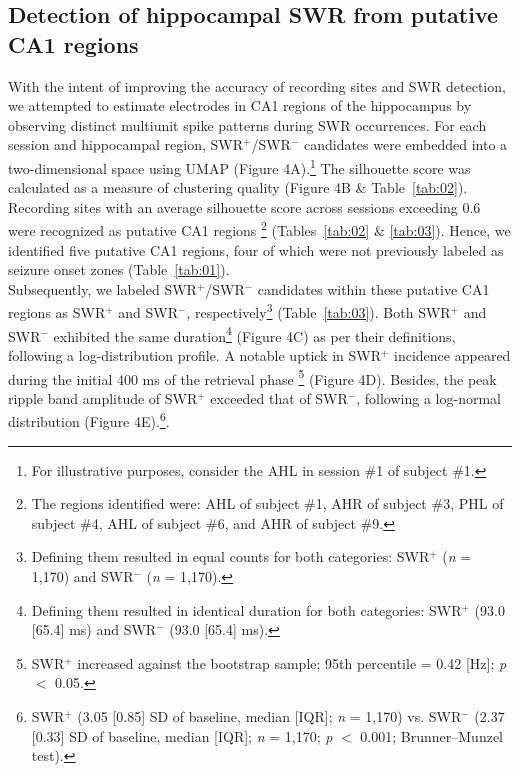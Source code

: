 \documentclass[final,3p,times,twocolumn]{elsarticle}
\newcommand{\REDSTARTS}{\color{red}}
\newcommand{\GREENENDS}{\color{black}}
\begin{document}
\begin{abstract\GREENENDS \REDSTARTS ll_Tables}
\subsection{Detection of hippocampal SWR from putative CA1 regions}
With the intent of improving the accuracy of recording sites and SWR detection, we attempted to estimate electrodes in CA1 regions of the hippocampus by observing distinct multiunit spike patterns during SWR occurrences. For each session and hippocampal region, SWR$^+$/SWR$^-$ candidates were embedded into a two-dimensional space using UMAP (Figure 4A).\footnote{For illustrative purposes, consider the AHL in session \#1 of subject \#1.} The silhouette score was calculated as a measure of clustering quality (Figure 4B \& Table~\ref{tab:02}). Recording sites with an average silhouette score across sessions exceeding 0.6 were recognized as putative CA1 regions \cite{mcinnes_umap_2018, rousseeuw_silhouettes_1987} \footnote{The regions identified were: AHL of subject \#1, AHR of subject \#3, PHL of subject \#4, AHL of subject \#6, and AHR of subject \#9.}  (Tables~\ref{tab:02} \& \ref{tab:03}). Hence, we identified five putative CA1 regions, four of which were not previously labeled as seizure onset zones (Table~\ref{tab:01}).
\\
\indent
Subsequently, we labeled SWR$^+$/SWR$^-$ candidates within these putative CA1 regions as SWR$^+$ and SWR$^-$, respectively\footnote{Defining them resulted in equal counts for both categories: SWR$^+$ (\textit{n} = 1,170) and SWR$^-$ (\textit{n} = 1,170).}  (Table~\ref{tab:03}). Both SWR$^+$ and SWR$^-$ exhibited the same duration\footnote{Defining them resulted in identical duration for both categories: SWR$^+$ (93.0 [65.4] ms) and SWR$^-$ (93.0 [65.4] ms).}  (Figure 4C) as per their definitions, following a log-distribution profile. A notable uptick in SWR$^+$ incidence appeared during the initial 400 ms of the retrieval phase \footnote{SWR$^+$ increased against the bootstrap sample; 95th percentile = 0.42 [Hz]; \textit{p} $<$ 0.05.}  (Figure 4D). Besides, the peak ripple band amplitude of SWR$^+$ exceeded that of SWR$^-$, following a log-normal distribution (Figure 4E).\footnote{SWR$^+$ (3.05 [0.85] SD of baseline, median [IQR]; \textit{n} = 1,170) vs. SWR$^-$ (2.37 [0.33] SD of baseline, median [IQR]; \textit{n} = 1,170; \textit{p} $<$ 0.001; Brunner--Munzel test).}.


\end{abstract\GREENENDS \REDSTARTS ll_Tables}
\end{document}
